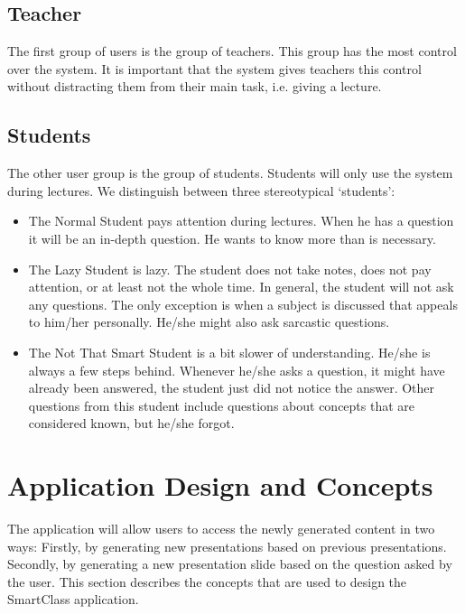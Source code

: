 \documentclass[11pt]{article}
\begin{document}
\subsection{Teacher}
The first group of users is the group of teachers. This group has the most control over the system. It is important that the system gives teachers this control without distracting them from their main task, i.e. giving a lecture.

\subsection{Students}
The other user group is the group of students. Students will only use the system during lectures. We distinguish between three stereotypical `students’:
\begin{itemize}
\item The Normal Student pays attention during lectures. When he has a question it will be an in-depth question. He wants to know more than is necessary.
\item The Lazy Student is lazy. The student does not take notes, does not pay attention, or at least not the whole time. In general, the student will not ask any questions. The only exception is when a subject is discussed that appeals to him/her personally. He/she might also ask sarcastic questions.
\item The Not That Smart Student is a bit slower of understanding. He/she is always a few steps behind. Whenever he/she asks a question, it might have already been answered, the student just did not notice the answer. Other questions from this student include questions about concepts that are considered known, but he/she forgot.
\end{itemize}

\section{Application Design and Concepts}
The application will allow users to access the newly generated content in two ways: Firstly, by generating new presentations based on previous presentations. Secondly, by generating a new presentation slide based on the question asked by the user. This section describes the concepts that are used to design the SmartClass application.
\end{document}
